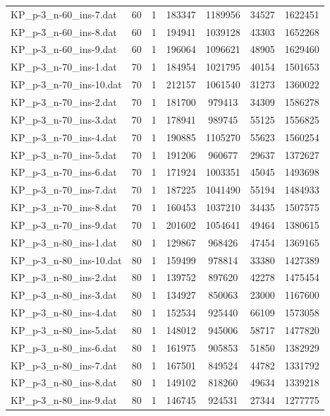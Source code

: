 \begin{table}[!ht]
\begin{tabular}{lcccccc}
KP\_p-3\_n-60\_ins-7.dat & 60 & 1 & 183347 & 1189956 & 34527 & 1622451 \\
KP\_p-3\_n-60\_ins-8.dat & 60 & 1 & 194941 & 1039128 & 43303 & 1652268 \\
KP\_p-3\_n-60\_ins-9.dat & 60 & 1 & 196064 & 1096621 & 48905 & 1629460 \\
KP\_p-3\_n-70\_ins-1.dat & 70 & 1 & 184954 & 1021795 & 40154 & 1501653 \\
KP\_p-3\_n-70\_ins-10.dat & 70 & 1 & 212157 & 1061540 & 31273 & 1360022 \\
KP\_p-3\_n-70\_ins-2.dat & 70 & 1 & 181700 & 979413 & 34309 & 1586278 \\
KP\_p-3\_n-70\_ins-3.dat & 70 & 1 & 178941 & 989745 & 55125 & 1556825 \\
KP\_p-3\_n-70\_ins-4.dat & 70 & 1 & 190885 & 1105270 & 55623 & 1560254 \\
KP\_p-3\_n-70\_ins-5.dat & 70 & 1 & 191206 & 960677 & 29637 & 1372627 \\
KP\_p-3\_n-70\_ins-6.dat & 70 & 1 & 171924 & 1003351 & 45045 & 1493698 \\
KP\_p-3\_n-70\_ins-7.dat & 70 & 1 & 187225 & 1041490 & 55194 & 1484933 \\
KP\_p-3\_n-70\_ins-8.dat & 70 & 1 & 160453 & 1037210 & 34435 & 1507575 \\
KP\_p-3\_n-70\_ins-9.dat & 70 & 1 & 201602 & 1054641 & 49464 & 1380615 \\
KP\_p-3\_n-80\_ins-1.dat & 80 & 1 & 129867 & 968426 & 47454 & 1369165 \\
KP\_p-3\_n-80\_ins-10.dat & 80 & 1 & 159499 & 978814 & 33380 & 1427389 \\
KP\_p-3\_n-80\_ins-2.dat & 80 & 1 & 139752 & 897620 & 42278 & 1475454 \\
KP\_p-3\_n-80\_ins-3.dat & 80 & 1 & 134927 & 850063 & 23000 & 1167600 \\
KP\_p-3\_n-80\_ins-4.dat & 80 & 1 & 152534 & 925440 & 66109 & 1573058 \\
KP\_p-3\_n-80\_ins-5.dat & 80 & 1 & 148012 & 945006 & 58717 & 1477820 \\
KP\_p-3\_n-80\_ins-6.dat & 80 & 1 & 161975 & 905853 & 51850 & 1382929 \\
KP\_p-3\_n-80\_ins-7.dat & 80 & 1 & 167501 & 849524 & 44782 & 1331792 \\
KP\_p-3\_n-80\_ins-8.dat & 80 & 1 & 149102 & 818260 & 49634 & 1339218 \\
KP\_p-3\_n-80\_ins-9.dat & 80 & 1 & 146745 & 924531 & 27344 & 1277775 \\

\end{tabular}
\end{table}
